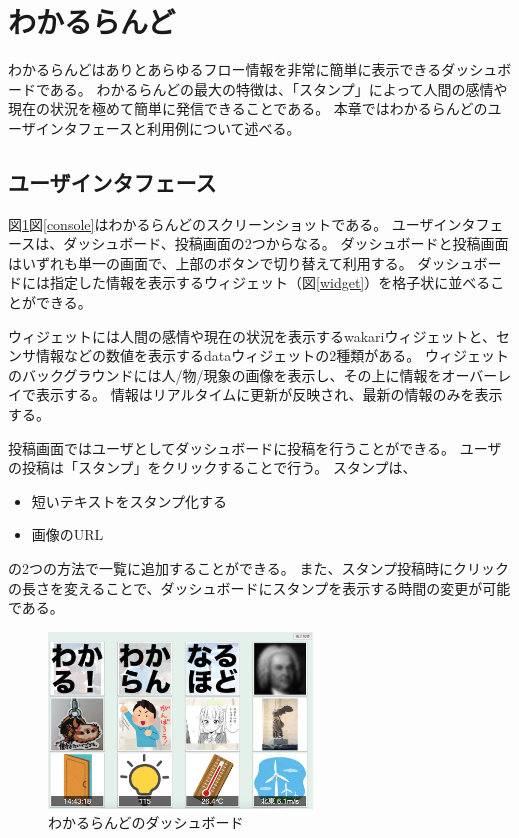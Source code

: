 \section{わかるらんど}

わかるらんどはありとあらゆるフロー情報を非常に簡単に表示できるダッシュボードである。
わかるらんどの最大の特徴は、「スタンプ」によって人間の感情や現在の状況を極めて簡単に発信できることである。
本章ではわかるらんどのユーザインタフェースと利用例について述べる。

\subsection{ユーザインタフェース}

図\ref{dashboard}図\ref{console}はわかるらんどのスクリーンショットである。
ユーザインタフェースは、ダッシュボード、投稿画面の2つからなる。
ダッシュボードと投稿画面はいずれも単一の画面で、上部のボタンで切り替えて利用する。
ダッシュボードには指定した情報を表示するウィジェット（図\ref{widget}）を格子状に並べることができる。

ウィジェットには人間の感情や現在の状況を表示するwakariウィジェットと、センサ情報などの数値を表示するdataウィジェットの2種類がある。
ウィジェットのバックグラウンドには人/物/現象の画像を表示し、その上に情報をオーバーレイで表示する。
情報はリアルタイムに更新が反映され、最新の情報のみを表示する。

投稿画面ではユーザとしてダッシュボードに投稿を行うことができる。
ユーザの投稿は「スタンプ」をクリックすることで行う。
スタンプは、
\begin{itemize}
\item 短いテキストをスタンプ化する
\item 画像のURL
\end{itemize}
の2つの方法で一覧に追加することができる。
また、スタンプ投稿時にクリックの長さを変えることで、ダッシュボードにスタンプを表示する時間の変更が可能である。

\begin{figure}[h]
\centering
\includegraphics[width=7cm]{images/dashboard.eps}
\caption{わかるらんどのダッシュボード}
\label{dashboard}
\end{figure}

